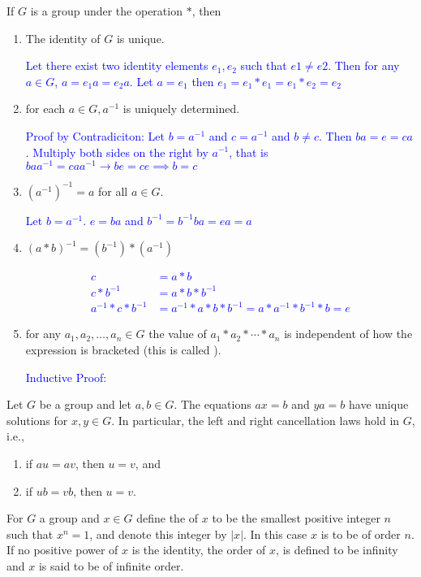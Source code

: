 \documentclass[10pt,a4paper]{report}
\newcommand{\BLUE}[1]{\textcolor{blue}{#1}}
\begin{document}
\begin{prop} If $G$ is a group under the operation $*$, then
\begin{enumerate}
	\item The identity of $G$ is unique.
	
	\BLUE{Let there exist two identity elements $e_1, e_2$ such that $e1 \ne e2$.  Then for any $a \in G$, $a=e_1a=e_2a$.  Let $a = e_1$ then $e_1 = e_1 * e_1 = e_1 *e_2 = e_2$}
	
	\item for each $a \in G, a^{-1}$ is uniquely determined.
	
	\BLUE{Proof by Contradiciton: Let $b = a^{-1}$ and $c = a^{-1}$ and $b \ne c$.  Then $ba=e=ca$.  Multiply both sides on the right by $a^{-1}$, that is $baa^{-1}=caa^{-1} \to be=ce \implies b=c$}
	
	\item $(a^{-1})^{-1}=a$ for all $a \in G$.
	
	\BLUE{Let $b = a^{-1}$.  $e=ba$ and $b^{-1}=b^{-1}ba = ea=a$}	
	
	\item $(a*b)^{-1}=(b^{-1})*(a^{-1})$
	
	\BLUE{\begin{align*}
		c&=a*b \\
		c*b^{-1} &= a*b*b^{-1} \\
		a^{-1}*c*b^{-1} &= a^{-1}*a*b*b^{-1} = a*a^{-1}*b^{-1}*b = e
	\end{align*}
	}
	
	\item for any $a_1, a_2, \dots, a_n \in G$ the value of $a_1*a_2*\cdots*a_n$ is independent of how the expression is bracketed (this is called ).
	
	\BLUE{Inductive Proof:}
\end{enumerate}
\end{prop}

\begin{prop}Let $G$ be a group and let $a,b  \in G$.  The equations $ax=b$ and $ya=b$ have unique solutions for $x,y \in G$.  In particular, the left and right cancellation laws hold in $G$, i.e.,
\begin{enumerate}
	\item if $au=av$, then $u=v$, and
	\item if $ub=vb$, then $u=v$.
\end{enumerate}
\end{prop}

\begin{definition} For $G$ a group and $x \in G$ define the  of $x$ to be the smallest positive integer $n$ such that $x^n=1$, and denote this integer by $|x|$.  In this case $x$ is to be of order $n$.  If no positive power of $x$ is the identity, the order of $x$, is defined to be infinity and $x$ is said to be of infinite order.
\end{definition}
\end{document}

